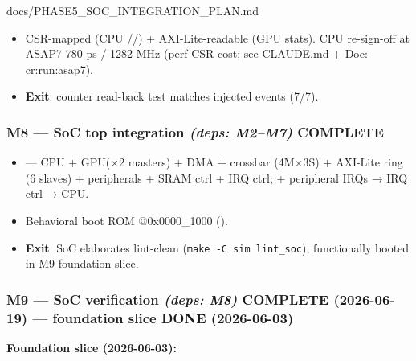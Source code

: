 \begin{relocated}{docs/PHASE5_SOC_INTEGRATION_PLAN.md}
\begin{itemize}
\tightlist
\item
  \ok{} CSR-mapped (CPU
  //) +
  AXI-Lite-readable (GPU stats). CPU re-sign-off at ASAP7 780 ps / 1282
  MHz (perf-CSR cost; see CLAUDE.md + Doc: cr:run:asap7).
\item
  \textbf{Exit}: \ok{} counter read-back test matches injected events
  (7/7).
\end{itemize}

\subsubsection{\texorpdfstring{M8 --- SoC top integration \emph{(deps:
M2--M7)} \ok{}
COMPLETE}{M8 --- SoC top integration (deps: M2--M7)  COMPLETE}}\label{ds:ch:phase5-soc-integration-plan:m8-soc-top-integration-deps-m2m7-white-check-mark-complete}

\begin{itemize}
\tightlist
\item
  \ok{}  --- CPU + GPU(×2 masters) + DMA +
  crossbar (4M×3S) + AXI-Lite ring (6 slaves) + peripherals + SRAM ctrl
  + IRQ ctrl;  + peripheral IRQs → IRQ ctrl → CPU.
\item
  \ok{} Behavioral boot ROM @0x0000\_\allowbreak{}1000
  ().
\item
  \textbf{Exit}: \ok{} SoC elaborates lint-clean
  (\texttt{make\ -\allowbreak{}C\ sim\ lint\_\allowbreak{}soc});
  functionally booted in M9 foundation slice.
\end{itemize}

\subsubsection{\texorpdfstring{M9 --- SoC verification \emph{(deps: M8)}
\ok{} COMPLETE (2026-06-19) --- foundation slice \ok{} DONE
(2026-06-03)}{M9 --- SoC verification (deps: M8)  COMPLETE (2026-06-19) --- foundation slice  DONE (2026-06-03)}}\label{ds:ch:phase5-soc-integration-plan:m9-soc-verification-deps-m8-white-check-mark-complete-2026-06-19-foundation-slice-white-check-mark-done-2026-06-03}

\textbf{Foundation slice \ok{} (2026-06-03):}


\end{relocated}
